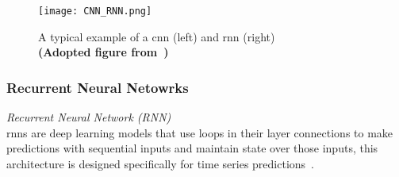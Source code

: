 \documentclass[../../D1.tex]{subfiles}
\begin{document}
\begin{figure}
    \texttt{[image: CNN\_RNN.png]} 
    \caption{A typical example of a \acrshort*{cnn} (left) and \acrshort{rnn} (right)\\ \textbf{(Adopted figure from~\autocite{chenDeepLearningMobile2020})}}
    \label{fig:exampleCnnRnn}   
\end{figure}

\subsubsection{Recurrent Neural Netowrks}
\emph{Recurrent Neural Network (RNN)\\}
\acrshort{rnn}s are deep learning models that use loops in their layer connections to make predictions with sequential inputs and maintain state over those inputs, this architecture is designed specifically for time series predictions~\autocite{chenDeepLearningEdge2019}.
\end{document}
